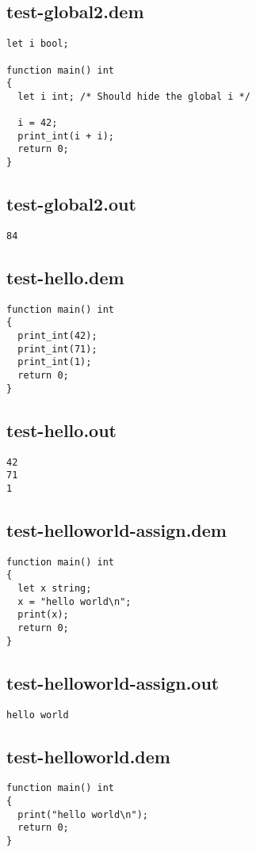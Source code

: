 \subsection{test-global2.dem}
\begin{lstlisting}
let i bool;

function main() int
{
  let i int; /* Should hide the global i */

  i = 42;
  print_int(i + i);
  return 0;
}
\end{lstlisting}
\subsection{test-global2.out}
\begin{lstlisting}
84
\end{lstlisting}
\subsection{test-hello.dem}
\begin{lstlisting}
function main() int
{
  print_int(42);
  print_int(71);
  print_int(1);
  return 0;
}
\end{lstlisting}
\subsection{test-hello.out}
\begin{lstlisting}
42
71
1
\end{lstlisting}
\subsection{test-helloworld-assign.dem}
\begin{lstlisting}
function main() int
{
  let x string;
  x = "hello world\n"; 
  print(x);
  return 0;
}
\end{lstlisting}
\subsection{test-helloworld-assign.out}
\begin{lstlisting}
hello world
\end{lstlisting}
\subsection{test-helloworld.dem}
\begin{lstlisting}
function main() int
{
  print("hello world\n");
  return 0;
}
\end{lstlisting}
